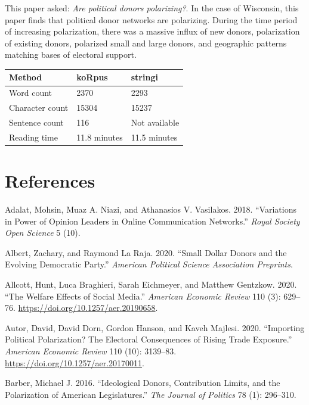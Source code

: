 \documentclass[12pt,]{article}
\begin{document}
This paper asked: \emph{Are political donors polarizing?}. In the case
of Wisconsin, this paper finds that political donor networks are
polarizing. During the time period of increasing polarization, there was
a massive influx of new donors, polarization of existing donors,
polarized small and large donors, and geographic patterns matching bases
of electoral support.

\newpage

\begin{longtable}[]{@{}lll@{}}
\toprule
Method & koRpus & stringi\tabularnewline
\midrule
\endhead
Word count & 2370 & 2293\tabularnewline
Character count & 15304 & 15237\tabularnewline
Sentence count & 116 & Not available\tabularnewline
Reading time & 11.8 minutes & 11.5 minutes\tabularnewline
\bottomrule
\end{longtable}

\hypertarget{references}{%
\section*{References}\label{references}}

\hypertarget{refs}{}
\leavevmode\hypertarget{ref-adalat2018}{}%
Adalat, Mohsin, Muaz A. Niazi, and Athanasios V. Vasilakos. 2018.
``Variations in Power of Opinion Leaders in Online Communication
Networks.'' \emph{Royal Society Open Science} 5 (10).

\leavevmode\hypertarget{ref-albert2020}{}%
Albert, Zachary, and Raymond La Raja. 2020. ``Small Dollar Donors and
the Evolving Democratic Party.'' \emph{American Political Science
Association Preprints}.

\leavevmode\hypertarget{ref-allcott2020}{}%
Allcott, Hunt, Luca Braghieri, Sarah Eichmeyer, and Matthew Gentzkow.
2020. ``The Welfare Effects of Social Media.'' \emph{American Economic
Review} 110 (3): 629--76. \url{https://doi.org/10.1257/aer.20190658}.

\leavevmode\hypertarget{ref-autor2020}{}%
Autor, David, David Dorn, Gordon Hanson, and Kaveh Majlesi. 2020.
``Importing Political Polarization? The Electoral Consequences of Rising
Trade Exposure.'' \emph{American Economic Review} 110 (10): 3139--83.
\url{https://doi.org/10.1257/aer.20170011}.

\leavevmode\hypertarget{ref-barber2016a}{}%
Barber, Michael J. 2016. ``Ideological Donors, Contribution Limits, and
the Polarization of American Legislatures.'' \emph{The Journal of
Politics} 78 (1): 296--310.
\end{document}
